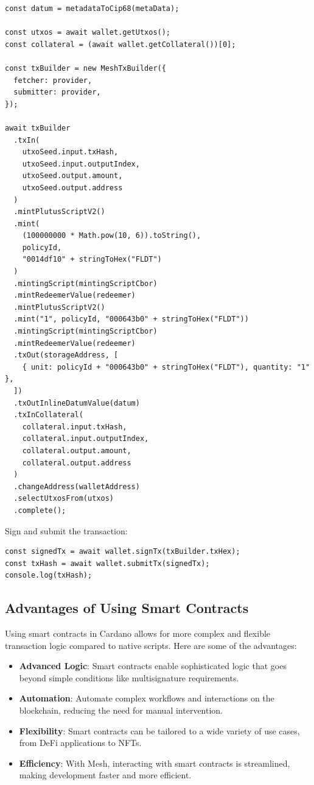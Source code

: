 \begin{lstlisting}
const datum = metadataToCip68(metaData);

const utxos = await wallet.getUtxos();
const collateral = (await wallet.getCollateral())[0];

const txBuilder = new MeshTxBuilder({
  fetcher: provider,
  submitter: provider,
});

await txBuilder
  .txIn(
    utxoSeed.input.txHash,
    utxoSeed.input.outputIndex,
    utxoSeed.output.amount,
    utxoSeed.output.address
  )
  .mintPlutusScriptV2()
  .mint(
    (100000000 * Math.pow(10, 6)).toString(),
    policyId,
    "0014df10" + stringToHex("FLDT")
  )
  .mintingScript(mintingScriptCbor)
  .mintRedeemerValue(redeemer)
  .mintPlutusScriptV2()
  .mint("1", policyId, "000643b0" + stringToHex("FLDT"))
  .mintingScript(mintingScriptCbor)
  .mintRedeemerValue(redeemer)
  .txOut(storageAddress, [
    { unit: policyId + "000643b0" + stringToHex("FLDT"), quantity: "1" },
  ])
  .txOutInlineDatumValue(datum)
  .txInCollateral(
    collateral.input.txHash,
    collateral.input.outputIndex,
    collateral.output.amount,
    collateral.output.address
  )
  .changeAddress(walletAddress)
  .selectUtxosFrom(utxos)
  .complete();
\end{lstlisting}

Sign and submit the transaction:

\begin{lstlisting}
const signedTx = await wallet.signTx(txBuilder.txHex);
const txHash = await wallet.submitTx(signedTx);
console.log(txHash);
\end{lstlisting}

\subsection{Advantages of Using Smart Contracts}

Using smart contracts in Cardano allows for more complex and flexible transaction logic compared to native scripts. Here are some of the advantages:

\begin{itemize}
\item \textbf{Advanced Logic}: Smart contracts enable sophisticated logic that goes beyond simple conditions like multisignature requirements.
\item \textbf{Automation}: Automate complex workflows and interactions on the blockchain, reducing the need for manual intervention.
\item \textbf{Flexibility}: Smart contracts can be tailored to a wide variety of use cases, from DeFi applications to NFTs.
\item \textbf{Efficiency}: With Mesh, interacting with smart contracts is streamlined, making development faster and more efficient.
\end{itemize}

